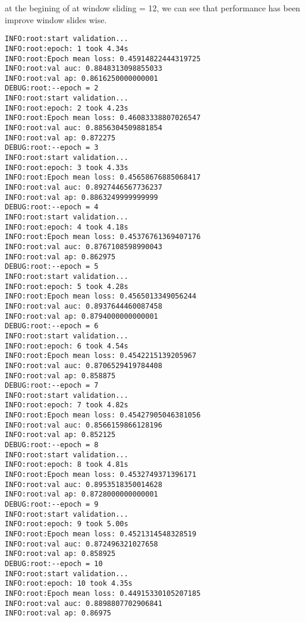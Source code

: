 \documentclass[11pt]{article}
\begin{document}
at the begining of at window sliding = 12, we  can see that performance has been improve window slides wise.
\begin{verbatim}
INFO:root:start validation...
INFO:root:epoch: 1 took 4.34s
INFO:root:Epoch mean loss: 0.45914822444319725
INFO:root:val auc: 0.8848313098855033
INFO:root:val ap: 0.8616250000000001
DEBUG:root:--epoch = 2
INFO:root:start validation...
INFO:root:epoch: 2 took 4.23s
INFO:root:Epoch mean loss: 0.46083338807026547
INFO:root:val auc: 0.8856304509881854
INFO:root:val ap: 0.872275
DEBUG:root:--epoch = 3
INFO:root:start validation...
INFO:root:epoch: 3 took 4.33s
INFO:root:Epoch mean loss: 0.45658676885068417
INFO:root:val auc: 0.8927446567736237
INFO:root:val ap: 0.8863249999999999
DEBUG:root:--epoch = 4
INFO:root:start validation...
INFO:root:epoch: 4 took 4.18s
INFO:root:Epoch mean loss: 0.45376761369407176
INFO:root:val auc: 0.8767108598990043
INFO:root:val ap: 0.862975
DEBUG:root:--epoch = 5
INFO:root:start validation...
INFO:root:epoch: 5 took 4.28s
INFO:root:Epoch mean loss: 0.4565013349056244
INFO:root:val auc: 0.8937644460087458
INFO:root:val ap: 0.8794000000000001
DEBUG:root:--epoch = 6
INFO:root:start validation...
INFO:root:epoch: 6 took 4.54s
INFO:root:Epoch mean loss: 0.4542215139205967
INFO:root:val auc: 0.8706529419784408
INFO:root:val ap: 0.858875
DEBUG:root:--epoch = 7
INFO:root:start validation...
INFO:root:epoch: 7 took 4.82s
INFO:root:Epoch mean loss: 0.45427905046381056
INFO:root:val auc: 0.8566159866128196
INFO:root:val ap: 0.852125
DEBUG:root:--epoch = 8
INFO:root:start validation...
INFO:root:epoch: 8 took 4.81s
INFO:root:Epoch mean loss: 0.4532749371396171
INFO:root:val auc: 0.8953518350014628
INFO:root:val ap: 0.8728000000000001
DEBUG:root:--epoch = 9
INFO:root:start validation...
INFO:root:epoch: 9 took 5.00s
INFO:root:Epoch mean loss: 0.4521314548328519
INFO:root:val auc: 0.872496321027658
INFO:root:val ap: 0.858925
DEBUG:root:--epoch = 10
INFO:root:start validation...
INFO:root:epoch: 10 took 4.35s
INFO:root:Epoch mean loss: 0.44915330105207185
INFO:root:val auc: 0.8898807702906841
INFO:root:val ap: 0.86975
\end{verbatim}
\end{document}
